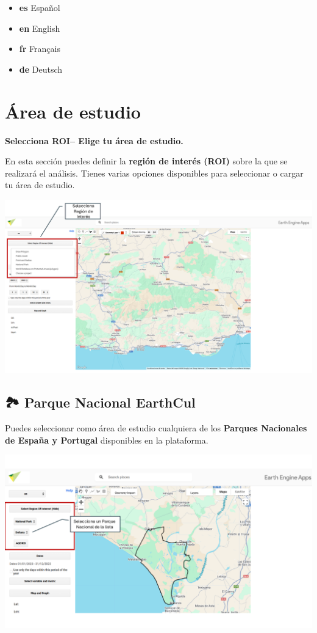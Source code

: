 \documentclass[
]{book}
\begin{document}
\begin{itemize}
\item
  \textbf{es}
  Español
\item
  \textbf{en}
  English
\item
  \textbf{fr}
  Français
\item
  \textbf{de}
  Deutsch
\end{itemize}

\chapter{Área de estudio}\label{area-estudio}

\textbf{Selecciona ROI-- Elige tu área de estudio.}

En esta sección puedes definir la \textbf{región de interés (ROI)} sobre la que se realizará el análisis. Tienes varias opciones disponibles para seleccionar o cargar tu área de estudio.

\includegraphics{assets/ROI_es.png}

\section{\texorpdfstring{\textbf{🏞️ Parque Nacional EarthCul}}{🏞️ Parque Nacional EarthCul}}\label{parque-nacional-earthcul}

Puedes seleccionar como área de estudio cualquiera de los \textbf{Parques Nacionales de España y Portugal} disponibles en la plataforma.

\includegraphics{assets/np_es.png}
\end{document}
